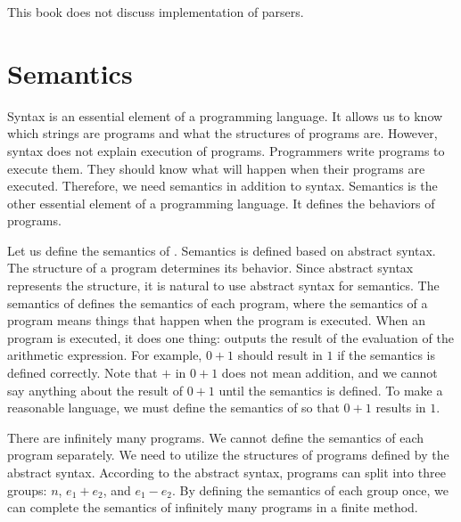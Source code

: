 \begin{center}
\end{center}

This book does not discuss implementation of parsers.

\section{Semantics}

Syntax is an essential element of a programming language. It allows us to know
which strings are programs and what the structures of programs are. However,
syntax does not explain execution of programs. Programmers write programs to
execute them. They should know what will happen when their programs are
executed. Therefore, we need semantics in addition to syntax. Semantics is the
other essential element of a programming language. It defines the behaviors of
programs.

Let us define the semantics of \lang. Semantics is defined based on abstract
syntax. The structure of a program determines its behavior. Since abstract
syntax represents the structure, it is natural to use abstract syntax for
semantics. The semantics of \lang defines the semantics of each \lang program,
where the semantics of a program means things that happen when the program is
executed. When an \lang program is executed, it does one thing: outputs the
result of the evaluation of the arithmetic expression.
For example, $0+1$ should result
in $1$ if the semantics is defined correctly. Note that $+$ in $0+1$ does not
mean addition, and we cannot say anything about the result of $0+1$ until the
semantics is defined. To make \lang a reasonable language, we must define the
semantics of \lang so that $0+1$ results in $1$.

There are infinitely many programs. We cannot define the semantics of each
program separately. We need to utilize the structures of programs defined by the
abstract syntax. According to the abstract syntax, programs can split into three
groups: $n$, $e_1+e_2$, and $e_1-e_2$. By defining the semantics of each group
once, we can complete the semantics of infinitely many programs in a finite
method.


